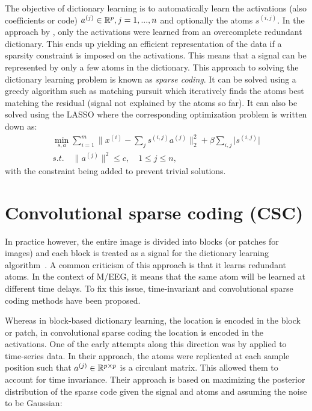The objective of dictionary learning is to automatically learn the activations (also coefficients or code) $a^{(j)} \in \mathbb{R}^{p}, j=1, ..., n$ and optionally the atoms $s^{(i, j)}$. In the approach by \citet{olshausen1997sparse}, only the activations were learned from an overcomplete redundant dictionary. This ends up yielding an efficient representation of the data if a sparsity constraint is imposed on the activations. This means that a signal can be represented by only a few atoms in the dictionary. This approach to solving the dictionary learning problem is known as \textit{sparse coding}. It can be solved using a greedy algorithm such as matching pursuit which iteratively finds the atoms best matching the residual (signal not explained by the atoms so far). It can also be solved using the LASSO where the corresponding optimization problem is written down as:
%
\begin{eqnarray}
\min_{s, a} \sum_{i=1}^{m} \|x^{(i)} - \sum_{j} s^{(i, j)} a^{(j)} \|_{2}^{2} + \beta \sum_{i,j} \lvert s^{(i,j)} \rvert \\
s.t. \quad \| a^{(j)} \|^{2} \leq c, \quad 1 \leq j \leq n,
\end{eqnarray}
\label{eq:optim}
%
with the constraint being added to prevent trivial solutions.

\section{Convolutional sparse coding (CSC)}

In practice however, the entire image is divided into blocks (or patches for images) and each block is treated as a signal for the dictionary learning algorithm~\citep{mairal2009online}. A common criticism of this approach is that it learns redundant atoms. In the context of M/EEG, it  means that the same atom will be learned at different time delays. To fix this issue, time-invariant and convolutional sparse coding methods have been proposed. 

Whereas in block-based dictionary learning, the location is encoded in the block or patch, in convolutional sparse coding the location is encoded in the activations. One of the early attempts along this direction was by \citet{lewicki1999coding} applied to time-series data. In their approach, the atoms were replicated at each sample position such that $a^{(j)} \in \mathbb{R}^{p \times p}$ is a circulant matrix. This allowed them to account for time invariance. Their approach is based on maximizing the posterior distribution of the sparse code given the signal and atoms and assuming the noise to be Gaussian:

